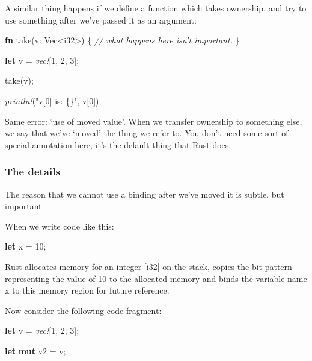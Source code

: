 \documentclass[a4paper,]{book}
\newenvironment{Shaded}{\begin{snugshade}}{\end{snugshade}}
\newcommand{\KeywordTok}[1]{\textcolor[rgb]{0.13,0.29,0.53}{\textbf{{#1}}}}
\newcommand{\DataTypeTok}[1]{\textcolor[rgb]{0.13,0.29,0.53}{{#1}}}
\newcommand{\DecValTok}[1]{\textcolor[rgb]{0.00,0.00,0.81}{{#1}}}
\newcommand{\StringTok}[1]{\textcolor[rgb]{0.31,0.60,0.02}{{#1}}}
\newcommand{\CommentTok}[1]{\textcolor[rgb]{0.56,0.35,0.01}{\textit{{#1}}}}
\newcommand{\PreprocessorTok}[1]{\textcolor[rgb]{0.56,0.35,0.01}{\textit{{#1}}}}
\newcommand{\NormalTok}[1]{{#1}}
\begin{document}
A similar thing happens if we define a function which takes ownership,
and try to use something after we've passed it as an argument:

\begin{Shaded}
\begin{Highlighting}[]
\KeywordTok{fn} \NormalTok{take(v: }\DataTypeTok{Vec}\NormalTok{<}\DataTypeTok{i32}\NormalTok{>) \{}
    \CommentTok{// what happens here isn’t important.}
\NormalTok{\}}

\KeywordTok{let} \NormalTok{v = }\PreprocessorTok{vec!}\NormalTok{[}\DecValTok{1}\NormalTok{, }\DecValTok{2}\NormalTok{, }\DecValTok{3}\NormalTok{];}

\NormalTok{take(v);}

\PreprocessorTok{println!}\NormalTok{(}\StringTok{"v[0] is: \{\}"}\NormalTok{, v[}\DecValTok{0}\NormalTok{]);}
\end{Highlighting}
\end{Shaded}

Same error: `use of moved value'. When we transfer ownership to
something else, we say that we've `moved' the thing we refer to. You
don't need some sort of special annotation here, it's the default thing
that Rust does.

\subsubsection{The details}\label{the-details}

The reason that we cannot use a binding after we've moved it is subtle,
but important.

When we write code like this:

\begin{Shaded}
\begin{Highlighting}[]
\KeywordTok{let} \NormalTok{x = }\DecValTok{10}\NormalTok{;}
\end{Highlighting}
\end{Shaded}

Rust allocates memory for an integer {[}i32{]} on the
\protect\hyperlink{sec--the-stack-and-the-heap}{stack}, copies the bit
pattern representing the value of 10 to the allocated memory and binds
the variable name x to this memory region for future reference.

Now consider the following code fragment:

\begin{Shaded}
\begin{Highlighting}[]
\KeywordTok{let} \NormalTok{v = }\PreprocessorTok{vec!}\NormalTok{[}\DecValTok{1}\NormalTok{, }\DecValTok{2}\NormalTok{, }\DecValTok{3}\NormalTok{];}

\KeywordTok{let} \KeywordTok{mut} \NormalTok{v2 = v;}
\end{Highlighting}
\end{Shaded}
\end{document}

